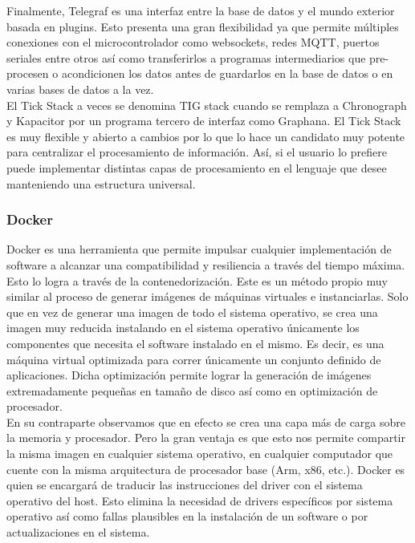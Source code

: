 Finalmente, Telegraf es una interfaz entre la base de datos y el mundo exterior basada en plugins. Esto presenta una gran flexibilidad ya que permite múltiples conexiones con el microcontrolador como websockets, redes MQTT, puertos seriales entre otros así como transferirlos a programas intermediarios que pre-procesen o acondicionen los datos antes de guardarlos en la base de datos o en varias bases de datos a la vez.\\

El Tick Stack a veces se denomina TIG stack cuando se remplaza a Chronograph y Kapacitor por un programa tercero de interfaz como Graphana. El Tick Stack es muy flexible y abierto a cambios por lo que lo hace un candidato muy potente para centralizar el procesamiento de información. Así, si el usuario lo prefiere puede implementar distintas capas de procesamiento en el lenguaje que desee manteniendo una estructura universal.\\

\subsubsection{Docker}
\label{sec:org2902b82}
Docker es una herramienta que permite impulsar cualquier implementación de software a alcanzar una compatibilidad y resiliencia a través del tiempo máxima. Esto lo logra a través de la contenedorización. Este es un método propio muy similar al proceso de generar imágenes de máquinas virtuales e instanciarlas. Solo que en vez de generar una imagen de todo el sistema operativo, se crea una imagen muy reducida instalando en el sistema operativo únicamente los componentes que necesita el software instalado en el mismo. Es decir, es una máquina virtual optimizada para correr únicamente un conjunto definido de aplicaciones. Dicha optimización permite lograr la generación de imágenes extremadamente pequeñas en tamaño de disco así como en optimización de procesador.\\

En su contraparte observamos que en efecto se crea una capa más de carga sobre la memoria y procesador. Pero la gran ventaja es que esto nos permite compartir la misma imagen en cualquier sistema operativo, en cualquier computador que cuente con la misma arquitectura de procesador base (Arm, x86, etc.). Docker es quien se encargará de traducir las instrucciones del driver con el sistema operativo del host. Esto elimina la necesidad de drivers específicos por sistema operativo así como fallas plausibles en la instalación de un software o por actualizaciones en el sistema.\\

